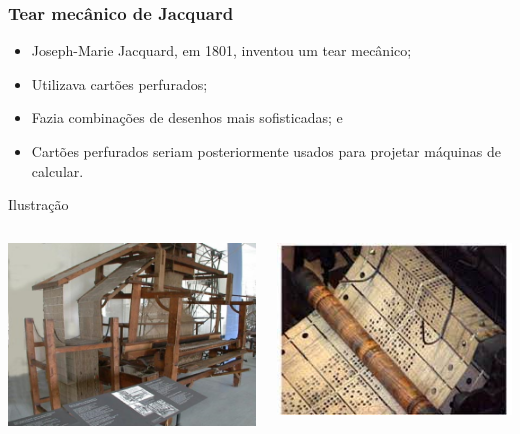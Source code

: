 \documentclass[aspectratio=169]{beamer} %
\begin{document}
\begin{frame}
	\frametitle{Tear mecânico de Jacquard}
	
	\begin{itemize}
		\item Joseph-Marie Jacquard, em 1801, inventou um tear mecânico;
		\item Utilizava cartões perfurados;
		\item Fazia combinações de desenhos mais sofisticadas; e
		\item Cartões perfurados seriam posteriormente usados para projetar máquinas de calcular.
	\end{itemize}\vfill
	
	\begin{exampleblock}{Ilustra\c cão}
		
		\begin{columns}[c]
				\includegraphics[scale=0.5]{img/tear_jacquard}
		
				\includegraphics[scale=0.5]{img/cartao_perfurado}
		\end{columns}
	\end{exampleblock}
\end{frame}
\end{document}
